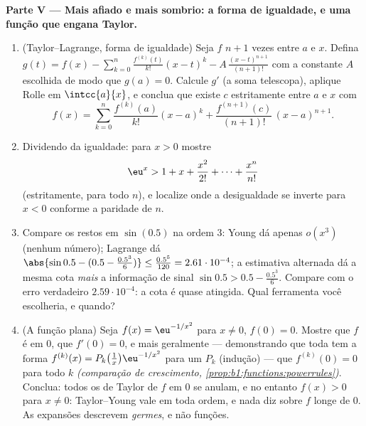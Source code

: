 \begin{problem}
\medskip
\noindent\textbf{Parte V --- Mais afiado e mais sombrio: a forma de
igualdade, e uma função que engana Taylor.}
\begin{enumerate}[resume]
  \item (Taylor--Lagrange, forma de igualdade) Seja $f$ $n + 1$
        vezes  entre $a$ e $x$. Defina $g(t) =
        f(x) - \sum_{k=0}^{n} \frac{f^{(k)}(t)}{k!}(x - t)^k -
        A\,\frac{(x-t)^{n+1}}{(n+1)!}$ com a constante
        $A$ escolhida de modo que $g(a) = 0$. Calcule $g'$ (a soma
        telescopa), aplique Rolle em $\intcc{a}{x}$, e conclua
        que existe $c$ estritamente entre $a$ e $x$ com
        \[
        f(x) = \sum_{k=0}^{n} \frac{f^{(k)}(a)}{k!}(x-a)^k
        + \frac{f^{(n+1)}(c)}{(n+1)!}\,(x-a)^{n+1} .
        \]
  \item Dividendo da igualdade: para $x > 0$ mostre
        \[
        \eu^x > 1 + x + \frac{x^2}{2!} + \dots +
        \frac{x^n}{n!}
        \]
        (estritamente, para todo $n$), e localize onde a
        desigualdade se inverte para $x < 0$ conforme a paridade
        de $n$.
  \item Compare os restos em $\sin(0.5)$ na ordem $3$:
        Young dá apenas $o(x^3)$ (nenhum número); Lagrange dá
        $\abs{\sin 0.5 - (0.5 - \frac{0.5^3}{6})} \leq
        \frac{0.5^5}{120} = 2.61\cdot10^{-4}$; a estimativa alternada dá a mesma cota \emph{mais} a
        informação de sinal $\sin 0.5 > 0.5 - \frac{0.5^3}{6}$. Compare com o erro verdadeiro
        $2.59\cdot10^{-4}$: a cota é quase atingida. Qual ferramenta você
        escolheria, e quando?
  \item (A função plana) Seja $f(x) = \eu^{-1/x^2}$ para $x
        \neq 0$, $f(0) = 0$. Mostre que $f$
        é  em $0$, que $f'(0) = 0$, e mais geralmente ---
        demonstrando que toda  tem a forma $f^{(k)}(x) =
        P_k\bigl(\frac1x\bigr)\eu^{-1/x^2}$ para um
         $P_k$ (indução) --- que $f^{(k)}(0) = 0$ para todo $k$
        \emph{(comparação de crescimento, \cref{prop:b1:functions:powerrules})}. Conclua: todos os
         de Taylor de $f$ em $0$ se anulam, e no entanto
        $f(x) > 0$ para $x \neq 0$: Taylor--Young vale em toda ordem, e nada
        diz sobre $f$ longe de $0$. As expansões descrevem
        \emph{germes}, e não funções.
\end{enumerate}


\end{problem}
